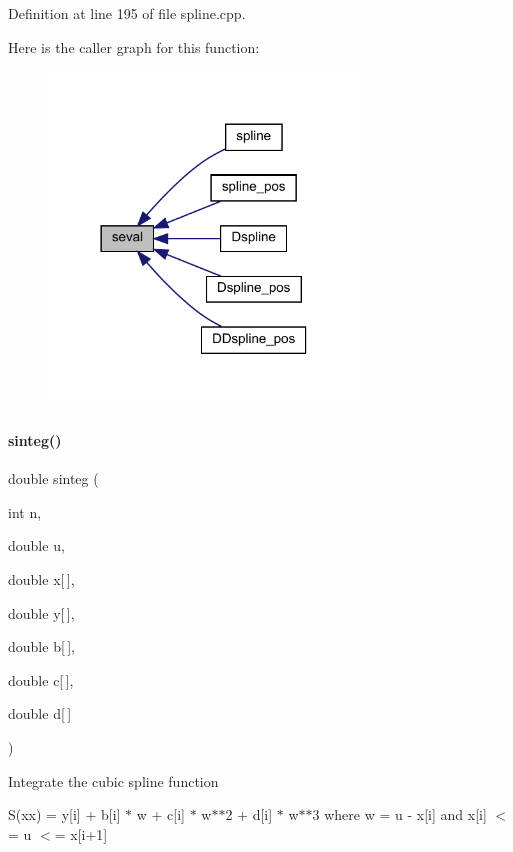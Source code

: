 Definition at line 195 of file spline.\+cpp.

Here is the caller graph for this function\+:
\nopagebreak
\begin{figure}[H]
\begin{center}
\leavevmode
\includegraphics[width=234pt]{namespaceamici_a20c8c27889853621fba3e0eacd333723_icgraph}
\end{center}
\end{figure}
\mbox{\label{namespaceamici_a158da90aec69a4796fb6f350ac6b71ab}} 
\paragraph{\texorpdfstring{sinteg()}{sinteg()}}
{\footnotesize\ttfamily double sinteg (\begin{DoxyParamCaption}\item[{int}]{n,  }\item[{double}]{u,  }\item[{double}]{x\mbox{[}$\,$\mbox{]},  }\item[{double}]{y\mbox{[}$\,$\mbox{]},  }\item[{double}]{b\mbox{[}$\,$\mbox{]},  }\item[{double}]{c\mbox{[}$\,$\mbox{]},  }\item[{double}]{d\mbox{[}$\,$\mbox{]} }\end{DoxyParamCaption})}

Integrate the cubic spline function

S(xx) = y\mbox{[}i\mbox{]} + b\mbox{[}i\mbox{]} $\ast$ w + c\mbox{[}i\mbox{]} $\ast$ w$\ast$$\ast$2 + d\mbox{[}i\mbox{]} $\ast$ w$\ast$$\ast$3 where w = u -\/ x\mbox{[}i\mbox{]} and x\mbox{[}i\mbox{]} $<$= u $<$= x\mbox{[}i+1\mbox{]}

